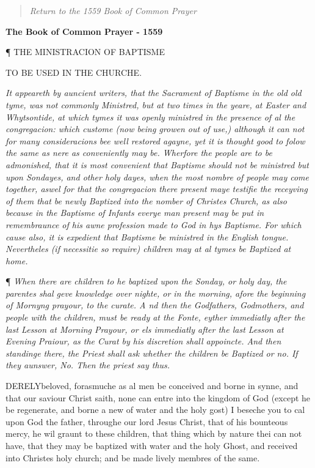 \begin{quote}

\emph{Return to the 1559
Book of Common Prayer}

\end{quote}


\textbf{The Book of Common Prayer - 1559}

¶
THE MINISTRACION OF BAPTISME

TO
BE USED IN THE CHURCHE.

\emph{I}\emph{t
appeareth by auncient writers, that the Sacrament of Baptisme in the old
old tyme, was not commonly Ministred, but at two times in the yeare, at
Easter and Whytsontide, at which tymes it was openly ministred in the
presence of al the congregacion: which custome (now being growen out of
use,) although it can not for many consideracions bee well restored agayne,
yet it is thought good to folow the same as nere as conveniently may be.
Wherfore the people are to be admonished, that it is most convenient that
Baptisme should not be ministred but upon Sondayes, and other holy dayes,
when the most nombre of people may come together, aswel for that the congregacion
there present maye testifie the receyving of them that be newly Baptized
into the nomber of Christes Church, as also because in the Baptisme of
Infants everye man present may be put in remembraunce of his awne profession
made to God in hys Baptisme. For which cause also, it is expedient that
Baptisme be ministred in the English tongue. Nevertheles (if necessitie
so require) children may at al tymes be Baptized at home.}

¶ \emph{When
there are children to he baptized upon the Sonday, or holy day, the parentes
shal geve knowledge over nighte, or in the morning, afore the beginning
of Mornyng prayour, to the curate. A nd then the Godfathers, Godmothers,
and people with the children, must be ready at the Fonte, eyther immediatly
after the last Lesson at Morning Prayour, or els immediatly after the
last Lesson at Evening Praiour, as the Curat by his discretion shall appoincte.
And then standinge there, the Priest shall ask whether the children be
Baptized or no. If they aunswer, No. Then the priest say thus.}

DERELY\textbf{}beloved, forasmuche as al men be conceived and borne in synne, and
that our saviour Christ saith, none can entre into the kingdom of God
(except he be regenerate, and borne a new of water and the holy gost)
I beseche you to cal upon God the father, throughe our lord Jesus Christ,
that of his bounteous mercy, he wil graunt to these children, that thing
which by nature thei can not have, that they may be baptized with water
and the holy Ghost, and received into Christes holy church; and be made
lively membres of the same.

